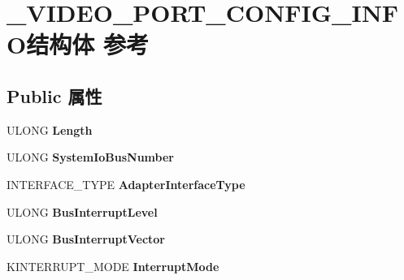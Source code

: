 \hypertarget{struct___v_i_d_e_o___p_o_r_t___c_o_n_f_i_g___i_n_f_o}{}\section{\+\_\+\+V\+I\+D\+E\+O\+\_\+\+P\+O\+R\+T\+\_\+\+C\+O\+N\+F\+I\+G\+\_\+\+I\+N\+F\+O结构体 参考}
\label{struct___v_i_d_e_o___p_o_r_t___c_o_n_f_i_g___i_n_f_o}
\subsection*{Public 属性}
\begin{DoxyCompactItemize}
\item 
\mbox{\label{struct___v_i_d_e_o___p_o_r_t___c_o_n_f_i_g___i_n_f_o_a06a20aeca4794ae504e31391fb9ef260}} 
U\+L\+O\+NG {\bfseries Length}
\item 
\mbox{\label{struct___v_i_d_e_o___p_o_r_t___c_o_n_f_i_g___i_n_f_o_a37239cb12cf9082d4a9c49e6d1459826}} 
U\+L\+O\+NG {\bfseries System\+Io\+Bus\+Number}
\item 
\mbox{\label{struct___v_i_d_e_o___p_o_r_t___c_o_n_f_i_g___i_n_f_o_a30017744962a4c6225824ed58f387bd8}} 
I\+N\+T\+E\+R\+F\+A\+C\+E\+\_\+\+T\+Y\+PE {\bfseries Adapter\+Interface\+Type}
\item 
\mbox{\label{struct___v_i_d_e_o___p_o_r_t___c_o_n_f_i_g___i_n_f_o_a8fc0445afff4ea35003e585aaf1eada0}} 
U\+L\+O\+NG {\bfseries Bus\+Interrupt\+Level}
\item 
\mbox{\label{struct___v_i_d_e_o___p_o_r_t___c_o_n_f_i_g___i_n_f_o_a6935e7b790162593817cf3b7bd25b47c}} 
U\+L\+O\+NG {\bfseries Bus\+Interrupt\+Vector}
\item 
\mbox{\label{struct___v_i_d_e_o___p_o_r_t___c_o_n_f_i_g___i_n_f_o_a139518523ae602ea4133fe9b8054be71}} 
K\+I\+N\+T\+E\+R\+R\+U\+P\+T\+\_\+\+M\+O\+DE {\bfseries Interrupt\+Mode}

\end{DoxyCompactItemize}

